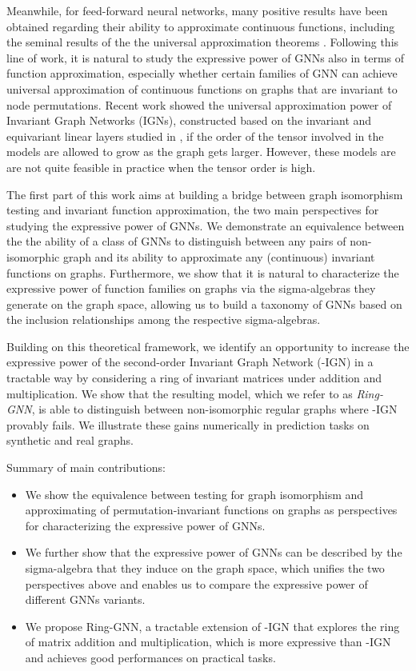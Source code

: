\documentclass{article}
\begin{document}
Meanwhile, for feed-forward neural networks, many positive results have been obtained regarding their ability to approximate continuous functions, including the seminal results of the the universal approximation theorems \cite{cybenko1989approximation, hornik1991hornik}. Following this line of work, it is natural to study the expressive power of GNNs also in terms of function approximation, especially whether certain families of GNN can achieve universal approximation of continuous functions on graphs that are invariant to node permutations. 
Recent work \cite{maron2019universality} showed the universal approximation power of Invariant Graph Networks (IGNs), constructed based on the invariant and equivariant linear layers studied in \cite{maron2018invariant}, if the order of the tensor involved in the models are allowed to grow as the graph gets larger. 
However, these models are are not quite feasible in practice when the tensor order is high.

The first part of this work aims at building a bridge between graph isomorphism testing and invariant function approximation, the two main perspectives for studying the expressive power of GNNs. We demonstrate an equivalence between the the ability of a class of GNNs to distinguish between any pairs of non-isomorphic graph and its ability to approximate any (continuous) invariant functions on graphs. Furthermore, we show that it is natural to characterize the expressive power of function families on graphs via the sigma-algebras they generate on the graph space, allowing us to build a taxonomy of GNNs based on the inclusion relationships among the respective sigma-algebras.

Building on this theoretical framework, we identify an opportunity to increase the expressive power of the second-order Invariant Graph Network (-IGN) in a tractable way by considering a ring of invariant matrices under addition and multiplication. We show that the resulting model, which we refer to as \emph{Ring-GNN}, is able to distinguish between non-isomorphic regular graphs where -IGN provably fails. We illustrate these gains numerically in prediction tasks on synthetic and real graphs. 

Summary of main contributions:
\begin{itemize}
    \item We show the equivalence between testing for graph isomorphism and approximating of permutation-invariant functions on graphs as perspectives for characterizing the expressive power of GNNs.
    \item We further show that the expressive power of GNNs can be described by the sigma-algebra that they induce on the graph space, which unifies the two perspectives above and enables us to compare the expressive power of different GNNs variants.
    \item We propose Ring-GNN, a tractable extension of -IGN that explores the ring of matrix addition and multiplication, which is more expressive than -IGN and achieves good performances on practical tasks.
\end{itemize}
\end{document}

